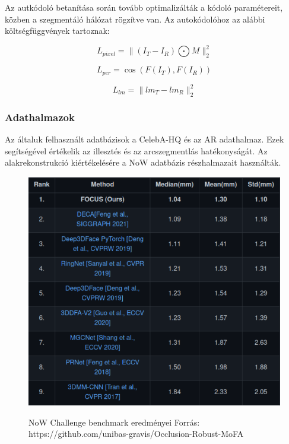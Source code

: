 \documentclass[12pt,a4]{article}
\begin{document}
         	      Az autkódoló betanítása során tovább optimalizálták a kódoló paramétereit, 
                közben a szegmentáló hálózat rögzítve van. Az autokódolóhoz az alábbi költségfüggvények tartoznak:
        
                \begin{equation*}
                    L_{pixel} = \parallel (I_{T} − I_{R}) \bigodot M \parallel _{2}^{2} 
                \end{equation*}
                
                \begin{equation*}
                    L_{per} = \cos(F(I_{T}), F(I_{R}))    
                \end{equation*}
                
                \begin{equation*}
                    L_{lm} = \parallel lm_{T} - lm_{R} \parallel _{2}^{2}  
                \end{equation*}
            \subsubsection{Adathalmazok}
            
             	Az általuk felhasznált adatbázisok a CelebA-HQ és az AR adathalmaz.
             	Ezek segítségével értékelik az illesztés és az arcszegmentlás hatékonyságát.
             	Az alakrekonstrukció kiértékelésére a NoW adatbázis
             	részhalmazait használták.
     	
             	\begin{figure}[h!]	
             		\centering
             		\includegraphics[width=0.7\linewidth]{now}
             		\label{fig:now}
             		\caption{NoW Challenge benchmark eredményei
             			Forrás: https://github.com/unibas-gravis/Occlusion-Robust-MoFA}
             	\end{figure} 
\end{document}

